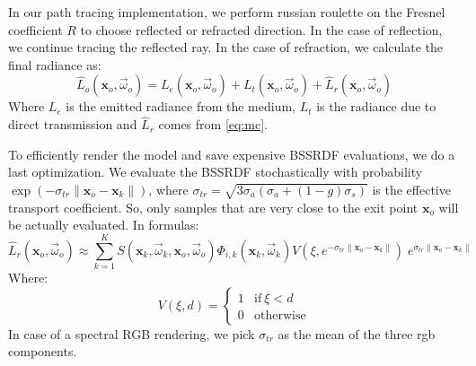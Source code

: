\documentclass[10pt,a4paper]{article}
\begin{document}
In our path tracing implementation, we perform russian roulette on the Fresnel coefficient $R$ to choose reflected or refracted direction. In the case of reflection, we continue tracing the reflected ray. In the case of refraction, we calculate the final radiance as:
\begin{equation*}
\hat{L}_o(\mathbf{x}_o, \vec{\omega}_o) = L_e(\mathbf{x}_o, \vec{\omega}_o) + L_t(\mathbf{x}_o, \vec{\omega}_o) + \hat{L}_r(\mathbf{x}_o, \vec{\omega}_o) 
\end{equation*}
Where $L_e$ is the emitted radiance from the medium, $L_t$ is the radiance due to direct transmission and $\hat{L}_r$ comes from \ref{eq:mc}. 

To efficiently render the model and save expensive BSSRDF evaluations, we do a last optimization. We evaluate the BSSRDF stochastically with probability $\exp(-\sigma_{tr} \| \mathbf{x}_o - \mathbf{x}_k \|)$, where $\sigma_{tr} = \sqrt{3 \sigma_a (\sigma_a + (1-g) \sigma_s)} $ is the effective transport coefficient.  So, only samples that are very close to the exit point $\mathbf{x}_o$ will be actually evaluated. In formulas:
\begin{equation*}
\hat{L}_r(\mathbf{x}_o, \vec{\omega}_o) \approx  \sum_{k = 1}^K S(\mathbf{x}_k, \vec{\omega}_k, \mathbf{x}_o, \vec{\omega}_o) \Phi_{i,k}(\mathbf{x}_k, \vec{\omega}_k) V(\xi, e^{-\sigma_{tr} \| \mathbf{x}_o - \mathbf{x}_k \|})\; e^{\sigma_{tr} \| \mathbf{x}_o - \mathbf{x}_k \|}
\end{equation*}
Where:
\begin{equation*}
V(\xi, d) = \begin{cases}
1 & \text{if} \ \xi < d \\
0 & \text{otherwise}
\end{cases}
\end{equation*}
In case of a spectral RGB rendering, we pick $\sigma_{tr}$ as the mean of the three rgb components. 
\end{document}
